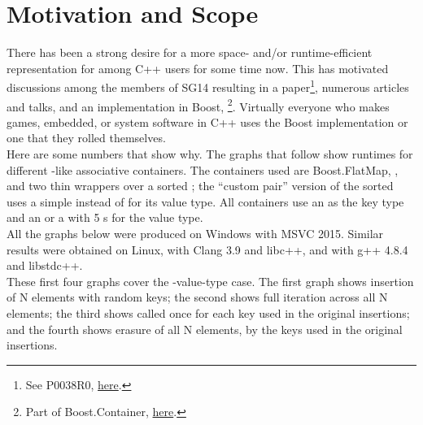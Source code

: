 \section{Motivation and Scope}

There has been a strong desire for a more space- and/or runtime-efficient
representation for  among C++ users for some time now.  This has
motivated discussions among the members of SG14 resulting in a
paper\footnote{See P0038R0,
  \href{http://www.open-std.org/jtc1/sc22/wg21/docs/papers/2015/p0038r0.html}{here}.},
numerous articles and talks, and an implementation in Boost,
\footnote{Part of Boost.Container,
  \href{http://www.boost.org/doc/libs/1_61_0/doc/html/container.html}{here}.}.
Virtually everyone who makes games, embedded, or system software in C++ uses
the Boost implementation or one that they rolled themselves.\\

Here are some numbers that show why.  The graphs that follow show runtimes for
different -like associative containers.  The containers used are
Boost.FlatMap, , and two thin wrappers over a sorted ;
the ``custom pair'' version of the sorted  uses a simple
 instead of  for its value type.  All containers use
an  as the key type and an  or a  with 5
s for the value type.\\

All the graphs below were produced on Windows with MSVC 2015.  Similar results
were obtained on Linux, with Clang 3.9 and libc++, and with g++ 4.8.4 and
libstdc++.\\

These first four graphs cover the -value-type case.  The first graph
shows insertion of N elements with random keys; the second shows full
iteration across all N elements; the third shows  called once
for each key used in the original insertions; and the fourth shows erasure of
all N elements, by the keys used in the original insertions.

